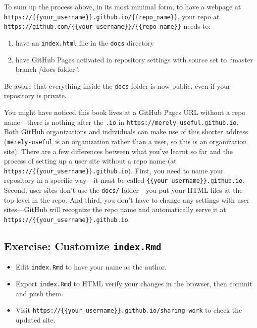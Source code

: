 \documentclass[]{Nemilov}
\providecommand{\tightlist}{%
  \setlength{\itemsep}{0pt}\setlength{\parskip}{0pt}}
\begin{document}
To sum up the process above,
in its most minimal form,
to have a webpage at \texttt{https://\{\{your\_username\}\}.github.io/\{\{repo\_name\}\}},
your repo at \texttt{https://github.com/\{\{your\_username\}\}/\{\{repo\_name\}\}} needs to:

\begin{enumerate}
\def\labelenumi{\arabic{enumi}.}
\tightlist
\item
  have an \texttt{index.html} file in the \texttt{docs} directory
\item
  have GitHub Pages activated in repository settings with source set to ``master branch /docs folder''.
\end{enumerate}

Be aware that everything inside the \texttt{docs} folder is now public,
even if your repository is private.

You might have noticed this book lives at a GitHub Pages URL
without a repo name---there is nothing after the \texttt{.io} in \texttt{https://merely-useful.github.io}.
Both GitHub organizations and individuals can make use of this shorter address
(\texttt{merely-useful} is an organization rather than a user,
so this is an organization site).
There are a few differences between what you've learnt so far and the process of setting up a user site without a repo name (at \texttt{https://\{\{your\_username\}\}.github.io}).
First,
you need to name your repository in a specific way---it must be called \texttt{\{\{your\_username\}\}.github.io}.
Second,
user sites don't use the \texttt{docs/} folder---you put your HTML files at the top level in the repo.
And third,
you don't have to change any settings with user sites---GitHub will recognize the repo name and automatically serve it at \texttt{https://\{\{your\_username\}\}.github.io}.

\hypertarget{exercise-customize-index.rmd}{%
\subsection{\texorpdfstring{Exercise: Customize \texttt{index.Rmd}}{Exercise: Customize index.Rmd}}\label{exercise-customize-index.rmd}}

\begin{itemize}
\item
  Edit \texttt{index.Rmd} to have your name as the author.
\item
  Export \texttt{index.Rmd} to HTML verify your changes in the browser,
  then commit and push them.
\item
  Visit \texttt{https://\{\{your\_username\}\}.github.io/sharing-work} to check the updated site.
\end{itemize}
\end{document}
